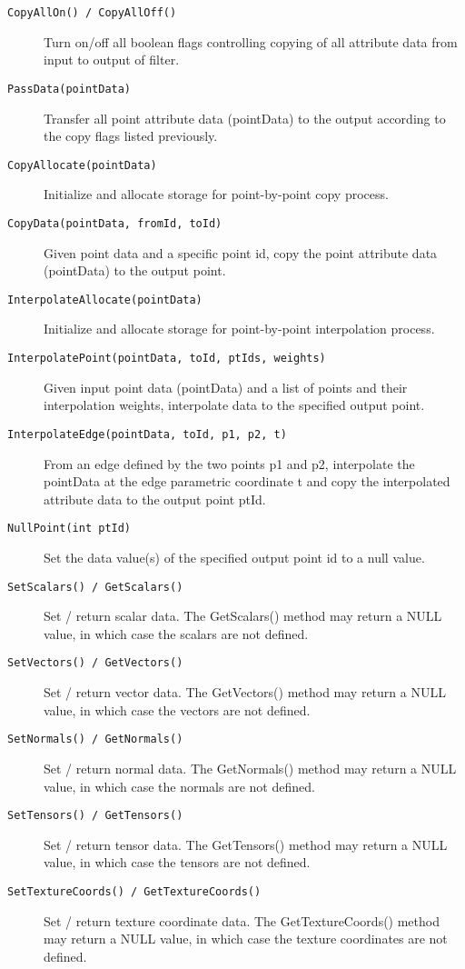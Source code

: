 \begin{description}
\begin{description}
    \item[\texttt{CopyAllOn() / CopyAllOff()}]
    Turn on/off all boolean flags controlling copying of all attribute data from input to output of filter.

    \item[\texttt{PassData(pointData)}]
    Transfer all point attribute data (pointData) to the output according to the copy flags listed previously.

    \item[\texttt{CopyAllocate(pointData)}]
    Initialize and allocate storage for point-by-point copy process.

    \item[\texttt{CopyData(pointData, fromId, toId)}]
    Given point data and a specific point id, copy the point attribute data (pointData) to the output point.

    \item[\texttt{InterpolateAllocate(pointData)}]
    Initialize and allocate storage for point-by-point interpolation process.

    \item[\texttt{InterpolatePoint(pointData, toId, ptIds, weights)}]
    Given input point data (pointData) and a list of points and their interpolation weights, interpolate data to the specified output point.

    \item[\texttt{InterpolateEdge(pointData, toId, p1, p2, t)}]
    From an edge defined by the two points p1 and p2, interpolate the pointData at the edge parametric coordinate t and copy the interpolated attribute data to the output point ptId.

    \item[\texttt{NullPoint(int ptId)}]
    Set the data value(s) of the specified output point id to a null value.

    \item[\texttt{SetScalars() / GetScalars()}]
    Set / return scalar data. The GetScalars() method may return a NULL value, in which case the scalars are not defined.

    \item[\texttt{SetVectors() / GetVectors()}]
    Set / return vector data. The GetVectors() method may return a NULL value, in which case the vectors are not defined.

    \item[\texttt{SetNormals() / GetNormals()}]
    Set / return normal data. The GetNormals() method may return a NULL value, in which case the normals are not defined.

    \item[\texttt{SetTensors() / GetTensors()}]
    Set / return tensor data. The GetTensors() method may return a NULL value, in which case the tensors are not defined.

    \item[\texttt{SetTextureCoords() / GetTextureCoords()}]
    Set / return texture coordinate data. The GetTextureCoords() method may return a NULL value, in which case the texture coordinates are not defined.

    \end{description}
\end{description}
